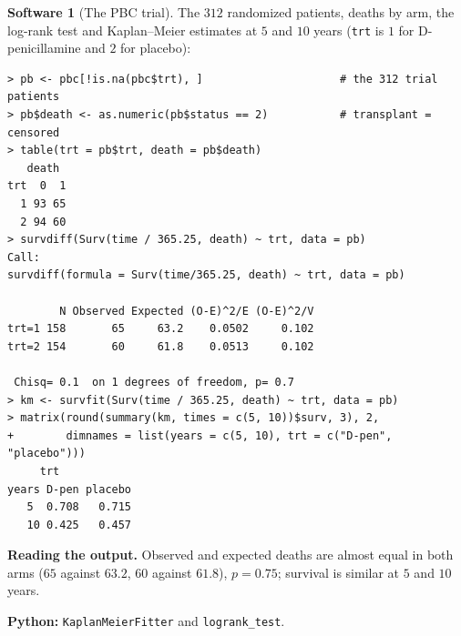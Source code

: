 \documentclass[11pt,a4paper]{article}
\numberwithin{equation}{section}
\theoremstyle{definition}
\newtheorem{software}[thm]{Software}
\begin{document}
\begin{software}[The PBC trial]
\label{sw:pbc}
The $312$ randomized patients, deaths by arm, the log-rank test and Kaplan--Meier estimates at $5$ and $10$ years (\texttt{trt} is $1$ for D-penicillamine and $2$ for placebo):
{\small\begin{verbatim}
> pb <- pbc[!is.na(pbc$trt), ]                     # the 312 trial patients
> pb$death <- as.numeric(pb$status == 2)           # transplant = censored
> table(trt = pb$trt, death = pb$death)
   death
trt  0  1
  1 93 65
  2 94 60
> survdiff(Surv(time / 365.25, death) ~ trt, data = pb)
Call:
survdiff(formula = Surv(time/365.25, death) ~ trt, data = pb)

        N Observed Expected (O-E)^2/E (O-E)^2/V
trt=1 158       65     63.2    0.0502     0.102
trt=2 154       60     61.8    0.0513     0.102

 Chisq= 0.1  on 1 degrees of freedom, p= 0.7 
> km <- survfit(Surv(time / 365.25, death) ~ trt, data = pb)
> matrix(round(summary(km, times = c(5, 10))$surv, 3), 2,
+        dimnames = list(years = c(5, 10), trt = c("D-pen", "placebo")))
     trt
years D-pen placebo
   5  0.708   0.715
   10 0.425   0.457
\end{verbatim}}
\textbf{Reading the output.} Observed and expected deaths are almost equal in both arms ($65$ against $63.2$, $60$ against $61.8$), $p = 0.75$; survival is similar at $5$ and $10$ years.

\textbf{Python:} \texttt{KaplanMeierFitter} and \texttt{logrank\_test}.
\end{software}
\end{document}
